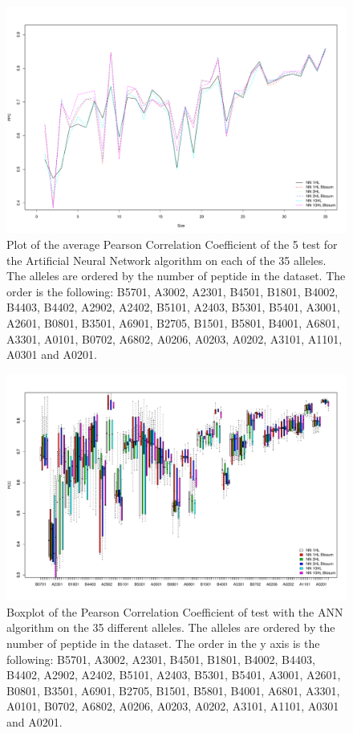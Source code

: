 \begin{figure}[ht]
\begin{center}
\includegraphics[width=18cm]{fig/annLNzoom.pdf}
\caption{Plot of the average Pearson Correlation Coefficient of the 5 test for the Artificial Neural Network algorithm on each of the 35 alleles. The alleles are ordered by the number of peptide in the dataset. The order is the following:
B5701, A3002, A2301, B4501, B1801, B4002, B4403, B4402, A2902, A2402, B5101, A2403, B5301, B5401, A3001, A2601, B0801, B3501, A6901, B2705, B1501, B5801, B4001, A6801, A3301, A0101, B0702, A6802, A0206, A0203, A0202, A3101, A1101, A0301 and A0201.}\label{fig:ann1}
\end{center}
\end{figure}

\begin{figure}[ht]
\begin{center}
\includegraphics[width=18cm]{fig/annBX1.pdf}
\caption{Boxplot of the Pearson Correlation Coefficient of test with the ANN algorithm on the 35 different alleles. The alleles are ordered by the number of peptide in the dataset. The order in the y axis is the following:
B5701, A3002, A2301, B4501, B1801, B4002, B4403, B4402, A2902, A2402, B5101, A2403, B5301, B5401, A3001, A2601, B0801, B3501, A6901, B2705, B1501, B5801, B4001, A6801, A3301, A0101, B0702, A6802, A0206, A0203, A0202, A3101, A1101, A0301 and A0201.}\label{fig:ann2}
\end{center}
\end{figure}
